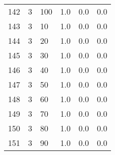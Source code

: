 \documentclass{article}
\begin{document}
\begin{center}
\begin{tabular}{llllll}
142 &         3 &        100 &              1.0 &                       0.0 &                                   0.0 \\
143 &         3 &         10 &              1.0 &                       0.0 &                                   0.0 \\
144 &         3 &         20 &              1.0 &                       0.0 &                                   0.0 \\
145 &         3 &         30 &              1.0 &                       0.0 &                                   0.0 \\
146 &         3 &         40 &              1.0 &                       0.0 &                                   0.0 \\
147 &         3 &         50 &              1.0 &                       0.0 &                                   0.0 \\
148 &         3 &         60 &              1.0 &                       0.0 &                                   0.0 \\
149 &         3 &         70 &              1.0 &                       0.0 &                                   0.0 \\
150 &         3 &         80 &              1.0 &                       0.0 &                                   0.0 \\
151 &         3 &         90 &              1.0 &                       0.0 &                                   0.0 \\
\bottomrule
\end{tabular}
\end{center}
\newpage
\end{document}
